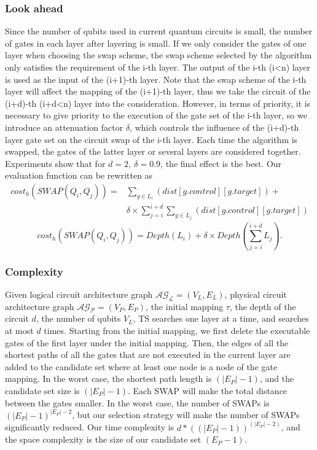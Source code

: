\documentclass[runningheads]{llncs}
\begin{document}
\subsubsection{Look ahead }
Since the number of qubits used in current quantum circuits is small,
 the number of gates in each layer after layering is small.
If we only consider the gates of one layer when choosing the swap scheme,
the swap scheme selected by the algorithm only satisfies the requirement of the i-th layer.
The output of the i-th (i<n) layer is used as the input of the (i+1)-th layer.
Note that the swap scheme of the i-th layer will affect the mapping 
of the (i+1)-th layer, thus we take the circuit of the (i+d)-th (i+d<n)
layer into the consideration.
However, in terms of priority, it is necessary to give priority to the 
execution of the gate set of the i-th layer, 
so we introduce an attenuation factor $\delta$, 
which controls the influence of the (i+d)-th layer gate set on the circuit 
swap of the i-th layer.
Each time the algorithm is swapped, 
the gates of the latter layer or several layers are considered together.
Experiments show that for $d=2,\ \delta=0.9$, the final effect is the best. 
Our evaluation function can be rewritten as
 \begin{equation}
	 	\begin{aligned}
			cost_{h}(SWAP(Q_{i},Q_{j}))=&\sum_{g \in L_{i}}(dist[g.control][g.target])+\\
	&\delta \times \sum_{j=i}^{i+d}\sum_{g \in L_{j}}(dist[g.control][g.target])
	\label{cost_num}
	\end{aligned}
 \end{equation}
	\begin{equation}
		cost_{h}(SWAP(Q_{i},Q_{j}))= Depth(L_{i})+\delta \times Depth(\sum_{j=i}^{i+d}L_{j}).
		\label{cost_depth}
		\end{equation}
\subsubsection{Complexity}
Given logical circuit architecture graph  $\mathcal{AG_{L}}=(V_{L},E_{L})$, 
physical circuit architecture graph $\mathcal{AG_{P}}=(V_{P},E_{P})$,
the initial mapping $\tau$, the depth of the circuit $d$,
 the number of qubits $V_{L}$, 
 TS searches one layer at a time, and searches at most $ d $ times.
Starting from the initial mapping, 
we first delete the executable gates of the first layer under the initial mapping.
Then, the edges of all the shortest paths of all the gates that are not executed in the current layer
 are added to the candidate set where at least one node is a node of the gate mapping.
In the worst case, the shortest path length is $(|E_{P}|-1)$, 
and the candidate set size is $(|E_{P}|-1)$. 
Each SWAP will make the total distance between the gates smaller. 
In the worst case, the number of SWAPs is $(|E_{P}|-1)^{|E_{P}|-2}$, 
but our selection strategy will make the number of SWAPs significantly 
reduced. Our time complexity is $d*((|E_{P}|-1))^{(|E_{P}|-2)}$, 
and the space complexity is the size of our candidate set $(E_{P}-1)$.
\end{document}
